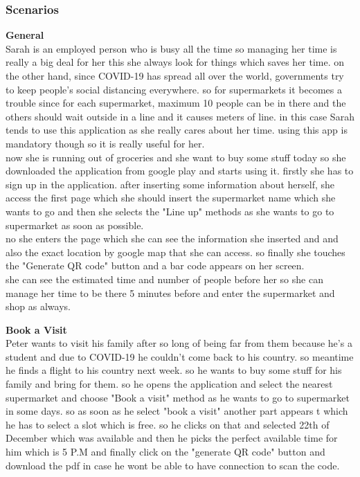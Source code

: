 \subsubsection{Scenarios}
\begin{SC}[wide]
    \item \textbf{General}\\
    Sarah is an employed person who is busy all the time so managing her time is really a big deal for her this she always look for things which saves her time. on the other hand, since COVID-19 has spread all over the world, governments try to keep people's social distancing everywhere. so for supermarkets it becomes a trouble since for each supermarket, maximum 10 people can be in there and the others should wait outside in a line and it causes meters of line. in this case Sarah tends to use this application as she really cares about her time. using this app is mandatory though so it is really useful for her.\\
    now she is running out of groceries and she want to buy some stuff today so she downloaded the application from google play and starts using it. firstly she has to sign up in the application. after inserting some information about herself, she access the first page which she should insert the supermarket name which she wants to go and then she selects the "Line up" methods as she wants to go to supermarket as soon as possible.\\
    no she enters the page which she can see the information she inserted and and also the exact location by google map that she can access. so finally she touches the "Generate QR code" button and a bar code appears on her screen.\\
    she can see the estimated time and number of people before her so she can manage her time to be there 5 minutes before and enter the supermarket and shop as always.\\
    
    \item \textbf{Book a Visit} \\
    Peter wants to visit his family after so long of being far from them because he's a student and due to COVID-19 he couldn't come back to his country. so meantime he finds a flight to his country next week. so he wants to buy some stuff for his family and bring for them. so he opens the application and select the nearest  supermarket and choose "Book a visit" method as he wants to go to supermarket in some days. so as soon as he select "book a visit" another part appears t which he has to select a slot which is free. so he clicks on that and selected 22th of December which was available and then he picks the perfect available time for him which is 5 P.M and finally click on the "generate QR code" button and download the pdf in case he wont be able to have connection to scan the code.\\
    

\end{SC}
